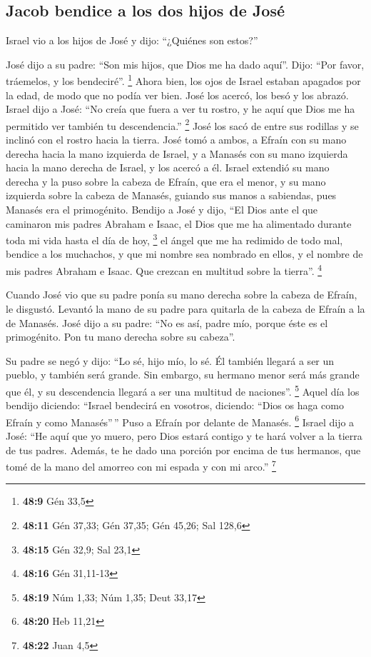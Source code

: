 \hypertarget{jacob-bendice-a-los-dos-hijos-de-josuxe9}{%
\subsection{Jacob bendice a los dos hijos de
José}\label{jacob-bendice-a-los-dos-hijos-de-josuxe9}}

 Israel vio a los hijos de José y dijo: ``¿Quiénes son
estos?''

 José dijo a su padre: ``Son mis hijos, que Dios me ha
dado aquí''. Dijo: ``Por favor, tráemelos, y los bendeciré''.
\footnote{\textbf{48:9} Gén 33,5}  Ahora bien, los ojos
de Israel estaban apagados por la edad, de modo que no podía ver bien.
José los acercó, los besó y los abrazó.  Israel dijo a
José: ``No creía que fuera a ver tu rostro, y he aquí que Dios me ha
permitido ver también tu descendencia.'' \footnote{\textbf{48:11} Gén
  37,33; Gén 37,35; Gén 45,26; Sal 128,6}  José los sacó
de entre sus rodillas y se inclinó con el rostro hacia la tierra.
 José tomó a ambos, a Efraín con su mano derecha hacia la
mano izquierda de Israel, y a Manasés con su mano izquierda hacia la
mano derecha de Israel, y los acercó a él.  Israel
extendió su mano derecha y la puso sobre la cabeza de Efraín, que era el
menor, y su mano izquierda sobre la cabeza de Manasés, guiando sus manos
a sabiendas, pues Manasés era el primogénito.  Bendijo a
José y dijo, ``El Dios ante el que caminaron mis padres Abraham e Isaac,
el Dios que me ha alimentado durante toda mi vida hasta el día de hoy,
\footnote{\textbf{48:15} Gén 32,9; Sal 23,1}  el ángel
que me ha redimido de todo mal, bendice a los muchachos, y que mi nombre
sea nombrado en ellos, y el nombre de mis padres Abraham e Isaac. Que
crezcan en multitud sobre la tierra''. \footnote{\textbf{48:16} Gén
  31,11-13}

 Cuando José vio que su padre ponía su mano derecha sobre
la cabeza de Efraín, le disgustó. Levantó la mano de su padre para
quitarla de la cabeza de Efraín a la de Manasés.  José
dijo a su padre: ``No es así, padre mío, porque éste es el primogénito.
Pon tu mano derecha sobre su cabeza''.

 Su padre se negó y dijo: ``Lo sé, hijo mío, lo sé. Él
también llegará a ser un pueblo, y también será grande. Sin embargo, su
hermano menor será más grande que él, y su descendencia llegará a ser
una multitud de naciones''. \footnote{\textbf{48:19} Núm 1,33; Núm 1,35;
  Deut 33,17}  Aquel día los bendijo diciendo: ``Israel
bendecirá en vosotros, diciendo: ``Dios os haga como Efraín y como
Manasés''\,'' Puso a Efraín por delante de Manasés. \footnote{\textbf{48:20}
  Heb 11,21}  Israel dijo a José: ``He aquí que yo muero,
pero Dios estará contigo y te hará volver a la tierra de tus padres.
 Además, te he dado una porción por encima de tus
hermanos, que tomé de la mano del amorreo con mi espada y con mi arco.''
\footnote{\textbf{48:22} Juan 4,5}

